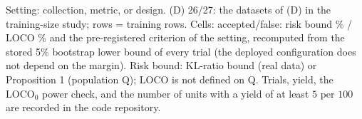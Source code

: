 \begin{table}[!t]
\vspace{2pt}
\parbox{\linewidth}{\justifying\scriptsize *Setting: collection, metric, or design. (D) 26/27: the datasets of (D) in the training-size study; rows = training rows. Cells: accepted/false: risk bound \% / LOCO \% and the pre-registered criterion of the setting, recomputed from the stored 5\% bootstrap lower bound of every trial (the deployed configuration does not depend on the margin). Risk bound: KL-ratio bound (real data) or Proposition 1 (population Q); LOCO is not defined on Q. Trials, yield, the LOCO$_0$ power check, and the number of units with a yield of at least $5$ per $100$ are recorded in the code repository.}
\end{table}
